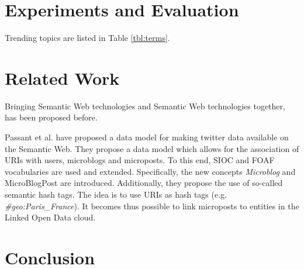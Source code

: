 \documentclass{llncs}
\begin{document}
\section{Experiments and Evaluation}

Trending topics are listed in Table \ref{tbl:terms}.


\begin{definition}[Stability]

\end{definition}

\section{Related Work}

Bringing Semantic Web technologies and Semantic Web technologies together, has been proposed before.

Passant et al. \cite{key:smob} have proposed a data model for making twitter
data available on the Semantic Web. They propose a data model which allows for the association of URIs with users, microblogs and microposts. To this end, SIOC and FOAF vocabularies are used and extended. Specifically, the new concepts \emph{Microblog} and {MicroBlogPost} are introduced. Additionally, they propose the use of so-called semantic hash tags. The idea is to use URIs as hash tags (e.g. \emph{\#geo:Paris\_France}). It becomes thus possible to link microposts to entities in the Linked Open Data cloud.
\section{Conclusion}







\end{document}
